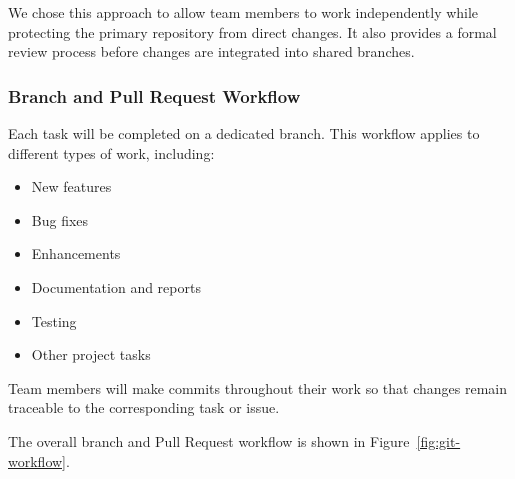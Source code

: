 \documentclass{article}
\begin{document}
We chose this approach to allow team members to work independently while
protecting the primary repository from direct changes. It also provides a
formal review process before changes are integrated into shared branches.


\subsubsection{Branch and Pull Request Workflow}

Each task will be completed on a dedicated branch. This workflow applies to
different types of work, including:

\begin{itemize}
    \item New features
    \item Bug fixes
    \item Enhancements
    \item Documentation and reports
    \item Testing
    \item Other project tasks
\end{itemize}

Team members will make commits throughout their work so that changes remain
traceable to the corresponding task or issue.

The overall branch and Pull Request workflow is shown in
Figure~\ref{fig:git-workflow}.
\end{document}
